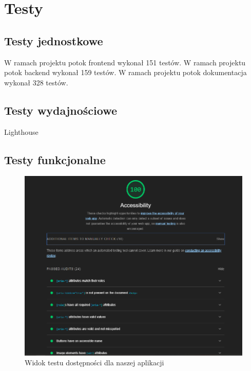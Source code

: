 
\chapter{Testy}
\label{ch:testy}

\section{Testy jednostkowe}
\label{sec:testy-jednostkowe}
W ramach projektu potok frontend wykonał 151 testów. \newline
W ramach projektu potok backend wykonał 159 testów. \newline
W ramach projektu potok dokumentacja wykonał 328 testów. \newline

\section{Testy wydajnościowe}
\label{sec:testy-wydajnosciowe}
Lighthouse
\section{Testy funkcjonalne}
\label{sec:testy-funkcjonalne}

\begin{figure}[H]
    \centering
    \includegraphics[width=1\textwidth]{attachments/testy-dostepnosci}
    \caption{Widok testu dostępności dla naszej aplikacji}
    \label{fig:testy-dostepnosci}
    \end{figure}